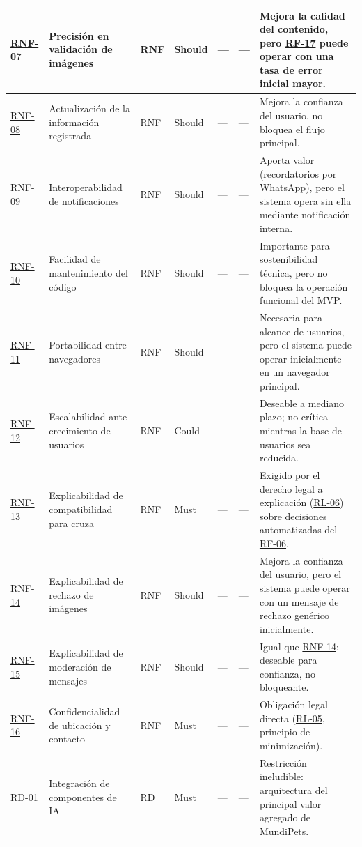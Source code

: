 \documentclass[journal,onecolumn]{IEEEtran}
\begin{document}
\begin{landscape}
\begin{longtable}{@{}p{1.2cm} p{5.2cm} p{1.0cm} p{1.3cm} p{1.3cm} p{1.1cm} p{6.5cm}@{}}
			\hyperref[tab:RNF-07]{RNF-07} & Precisión en validación de imágenes & RNF & Should & --- & --- & Mejora la calidad del contenido, pero \hyperref[tab:RF-17]{RF-17} puede operar con una tasa de error inicial mayor. \\ \midrule
			\hyperref[tab:RNF-08]{RNF-08} & Actualización de la información registrada & RNF & Should & --- & --- & Mejora la confianza del usuario, no bloquea el flujo principal. \\ \midrule
			\hyperref[tab:RNF-09]{RNF-09} & Interoperabilidad de notificaciones & RNF & Should & --- & --- & Aporta valor (recordatorios por WhatsApp), pero el sistema opera sin ella mediante notificación interna. \\ \midrule
			\hyperref[tab:RNF-10]{RNF-10} & Facilidad de mantenimiento del código & RNF & Should & --- & --- & Importante para sostenibilidad técnica, pero no bloquea la operación funcional del MVP. \\ \midrule
			\hyperref[tab:RNF-11]{RNF-11} & Portabilidad entre navegadores & RNF & Should & --- & --- & Necesaria para alcance de usuarios, pero el sistema puede operar inicialmente en un navegador principal. \\ \midrule
			\hyperref[tab:RNF-12]{RNF-12} & Escalabilidad ante crecimiento de usuarios & RNF & Could & --- & --- & Deseable a mediano plazo; no crítica mientras la base de usuarios sea reducida. \\ \midrule
			\hyperref[tab:RNF-13]{RNF-13} & Explicabilidad de compatibilidad para cruza & RNF & Must & --- & --- & Exigido por el derecho legal a explicación (\hyperref[rl:06]{RL-06}) sobre decisiones automatizadas del \hyperref[tab:RF-06]{RF-06}. \\ \midrule
			\hyperref[tab:RNF-14]{RNF-14} & Explicabilidad de rechazo de imágenes & RNF & Should & --- & --- & Mejora la confianza del usuario, pero el sistema puede operar con un mensaje de rechazo genérico inicialmente. \\ \midrule
			\hyperref[tab:RNF-15]{RNF-15} & Explicabilidad de moderación de mensajes & RNF & Should & --- & --- & Igual que \hyperref[tab:RNF-14]{RNF-14}: deseable para confianza, no bloqueante. \\ \midrule
			\hyperref[tab:RNF-16]{RNF-16} & Confidencialidad de ubicación y contacto & RNF & Must & --- & --- & Obligación legal directa (\hyperref[rl:05]{RL-05}, principio de minimización). \\ \midrule
			\hyperref[tab:RD-01]{RD-01} & Integración de componentes de IA & RD & Must & --- & --- & Restricción ineludible: arquitectura del principal valor agregado de MundiPets. \\ \midrule

\end{longtable}
\end{landscape}
\end{document}
